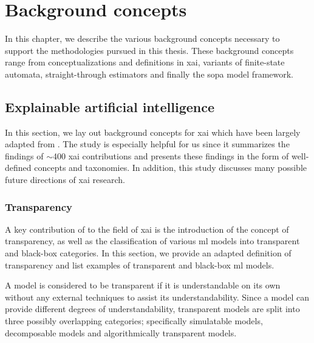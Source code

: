 \chapter{Background concepts}

\label{chapter:background}

In this chapter, we describe the various background concepts necessary to
support the methodologies pursued in this thesis. These background concepts
range from conceptualizations and definitions in \ac{xai}, variants of
finite-state automata, straight-through estimators and finally the \ac{sopa}
model framework.

\section{Explainable artificial intelligence}

\label{section:xai}

In this section, we lay out background concepts for \ac{xai} which have been
largely adapted from \citet{arrieta2020explainable}. The study is especially
helpful for us since it summarizes the findings of $\sim$400 \ac{xai}
contributions and presents these findings in the form of well-defined concepts
and taxonomies. In addition, this study discusses many possible future
directions of \ac{xai} research.

\subsection{Transparency}

A key contribution of \citet{arrieta2020explainable} to the field of
\ac{xai} is the introduction of the concept of transparency, as well as the
classification of various \ac{ml} models into transparent and
black-box categories. In this section, we provide an adapted definition of
transparency and list examples of transparent and black-box \ac{ml} models.

\begin{definition}
  A model is considered to be transparent if it is understandable on its own
  without any external techniques to assist its understandability. Since a model
  can provide different degrees of understandability, transparent models are
  split into three possibly overlapping categories; specifically
  simulatable models, decomposable models and algorithmically transparent
  models.
\end{definition}

